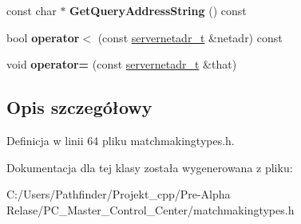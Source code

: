 \begin{DoxyCompactItemize}
const char $\ast$ {\bfseries Get\+Query\+Address\+String} () const
\item 
\mbox{\label{classservernetadr__t_a987f0a867955c982f03d9a3f1ba90c2c}} 
bool {\bfseries operator$<$} (const \hyperlink{classservernetadr__t}{servernetadr\+\_\+t} \&netadr) const
\item 
\mbox{\label{classservernetadr__t_ac0d492466185acc12afb506520b88de9}} 
void {\bfseries operator=} (const \hyperlink{classservernetadr__t}{servernetadr\+\_\+t} \&that)
\end{DoxyCompactItemize}


\subsection{Opis szczegółowy}


Definicja w linii 64 pliku matchmakingtypes.\+h.



Dokumentacja dla tej klasy została wygenerowana z pliku\+:\begin{DoxyCompactItemize}
\item 
C\+:/\+Users/\+Pathfinder/\+Projekt\+\_\+cpp/\+Pre-\/\+Alpha Relase/\+P\+C\+\_\+\+Master\+\_\+\+Control\+\_\+\+Center/matchmakingtypes.\+h\end{DoxyCompactItemize}

